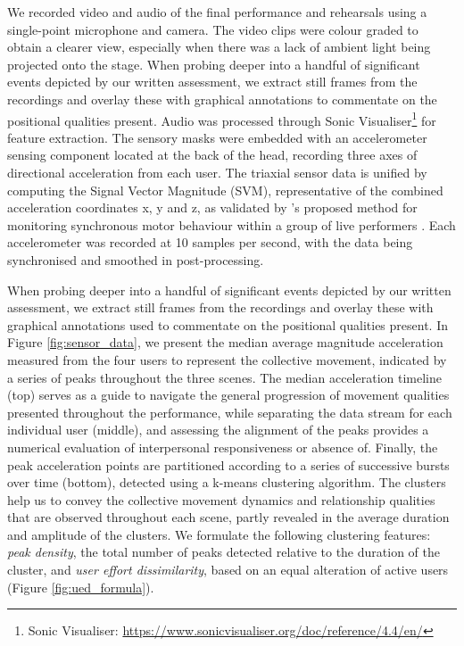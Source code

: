We recorded video and audio of the final performance and rehearsals using a single-point microphone and camera. The video clips were colour graded to obtain a clearer view, especially when there was a lack of ambient light being projected onto the stage. When probing deeper into a handful of significant events depicted by our written assessment, we extract still frames from the recordings and overlay these with graphical annotations to commentate on the positional qualities present. Audio was processed through Sonic Visualiser\footnote{Sonic Visualiser: \url{https://www.sonicvisualiser.org/doc/reference/4.4/en/}} for feature extraction. The sensory masks were embedded with an accelerometer sensing component located at the back of the head, recording three axes of directional acceleration from each user. The triaxial sensor data is unified by computing the Signal Vector Magnitude (SVM), representative of the combined acceleration coordinates x, y and z, as validated by \citeauthor{ward_sensing_2018}'s proposed method for monitoring synchronous motor behaviour within a group of live performers \cite{ward_sensing_2018}. Each accelerometer was recorded at 10 samples per second, with the data being synchronised and smoothed in post-processing.

When probing deeper into a handful of significant events depicted by our written assessment, we extract still frames from the recordings and overlay these with graphical annotations used to commentate on the positional qualities present. In Figure \ref{fig:sensor_data}, we present the median average magnitude acceleration measured from the four users to represent the collective movement, indicated by a series of peaks throughout the three scenes. The median acceleration timeline (top) serves as a guide to navigate the general progression of movement qualities presented throughout the performance, while separating the data stream for each individual user (middle), and assessing the alignment of the peaks provides a numerical evaluation of interpersonal responsiveness or absence of. Finally, the peak acceleration points are partitioned according to a series of successive bursts over time (bottom), detected using a k-means clustering algorithm. The clusters help us to convey the collective movement dynamics and relationship qualities that are observed throughout each scene, partly revealed in the average duration and amplitude of the clusters. We formulate the following clustering features: \textit{peak density}, the total number of peaks detected relative to the duration of the cluster, and \textit{user effort dissimilarity}, based on an equal alteration of active users (Figure \ref{fig:ued_formula}).


